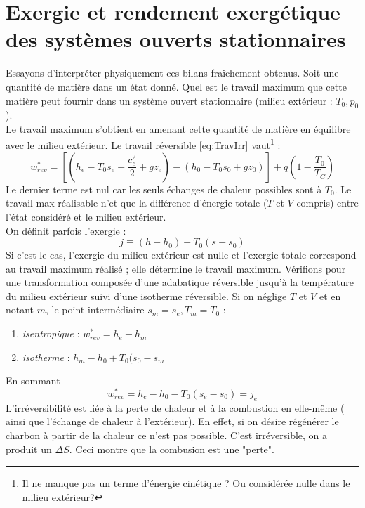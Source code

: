 		
	\newpage
	\section{Exergie et rendement exergétique des systèmes ouverts stationnaires}
	Essayons d’interpréter physiquement ces bilans fraîchement obtenus. Soit une 
	quantité de matière dans un état donné. Quel est le travail maximum que cette 
	matière peut fournir dans un système ouvert stationnaire (milieu extérieur : 
	$T_0,p_0$).\\
	Le travail maximum s'obtient en amenant cette quantité de matière en équilibre 
	avec le milieu extérieur. Le travail réversible \autoref{eq:TravIrr} vaut\footnote{
	Il ne manque pas un terme d'énergie cinétique ? Ou considérée nulle dans le milieu extérieur?} :
	\begin{equation}
	w_{rev}^* = \left[\left(h_e-T_0s_e+\dfrac{c_e^2}{2}+gz_e\right) - \left(h_0-T_0s_0
	+gz_0\right)\right] + q\left(1-\dfrac{T_0}{T_C}\right)
	\end{equation}
	Le dernier terme est nul car les seuls échanges de chaleur possibles sont à $T_0$. 
	Le travail max réalisable n'et que la différence d'énergie totale ($T$ et $V$ compris) 
	entre l'état considéré et le milieu extérieur.\\
	On définit parfois l'exergie :
	\begin{equation}
	j \equiv (h-h_0) - T_0(s-s_0)
	\end{equation}
	Si c'est le cas, l'exergie du milieu extérieur est nulle et l'exergie totale 
	correspond au travail maximum réalisé ; elle détermine le travail maximum. Vérifions 
	pour une transformation composée d'une adabatique réversible jusqu'à la température 
	du milieu extérieur suivi d'une isotherme réversible. Si on néglige $T$ et $V$ et 
	en notant $m$, le point intermédiaire $s_m=s_e, T_m=T_0$ :
	\begin{enumerate}
	\item \textit{isentropique} : $w_{rev}^* = h_e-h_m$
 	\item \textit{isotherme} : $h_m-h_0 + T_0(s_0-s_m$
	\end{enumerate}
	En sommant
	\begin{equation}
	w_{rev}^* = h_e-h_0 - T_0(s_e-s_0) = j_e
	\end{equation}
	L'irréversibilité est liée à la perte de chaleur et à la combustion en elle-même (
	ainsi que l'échange de chaleur à l'extérieur). En effet, si on désire régénérer 
	le charbon à partir de la chaleur ce n'est pas possible. C'est irréversible, on a 
	produit un $\Delta S$. Ceci montre que la combusion est une "perte".\\
	
